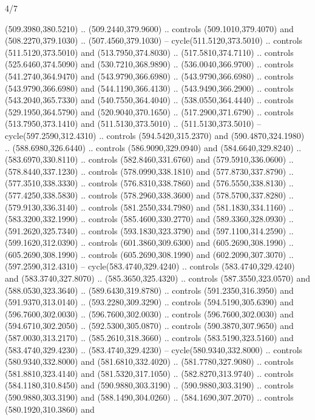 \begin{flagdescription}{4/7}
\begin{scope}[shift={(0.5\flaglength,0.5\flagwidth)},scale=\flagwidth*\stretchfactor/820]
\begin{scope}[scale=1.87,xshift=-138mm,yshift=75mm]
\begin{scope}[y=0.8pt, x=0.8pt, yscale=-1, xscale=1]
\begin{scope}[fill=c9ca168]
  (509.3980,380.5210) .. (509.2440,379.9600) .. controls (509.1010,379.4070) and
  (508.2270,379.1030) .. (507.4560,379.1030) -- cycle(511.5120,373.5010) ..
  controls (511.5120,373.5010) and (513.7950,374.8030) .. (517.5810,374.7110) ..
  controls (525.6460,374.5090) and (530.7210,368.9890) .. (536.0040,366.9700) ..
  controls (541.2740,364.9470) and (543.9790,366.6980) .. (543.9790,366.6980) ..
  controls (543.9790,366.6980) and (544.1190,366.4130) .. (543.9490,366.2900) ..
  controls (543.2040,365.7330) and (540.7550,364.4040) .. (538.0550,364.4440) ..
  controls (529.1950,364.5790) and (520.9040,370.1650) .. (517.2900,371.6790) ..
  controls (513.7950,373.1410) and (511.5130,373.5010) .. (511.5130,373.5010) --
  cycle(597.2590,312.4310) .. controls (594.5420,315.2370) and
  (590.4870,324.1980) .. (588.6980,326.6440) .. controls (586.9090,329.0940) and
  (584.6640,329.8240) .. (583.6970,330.8110) .. controls (582.8460,331.6760) and
  (579.5910,336.0600) .. (578.8440,337.1230) .. controls (578.0990,338.1810) and
  (577.8730,337.8790) .. (577.3510,338.3330) .. controls (576.8310,338.7860) and
  (576.5550,338.8130) .. (577.4250,338.5830) .. controls (578.2960,338.3600) and
  (578.5700,337.8280) .. (579.9130,336.3140) .. controls (581.2550,334.7980) and
  (581.1830,334.1160) .. (583.3200,332.1990) .. controls (585.4600,330.2770) and
  (589.3360,328.0930) .. (591.2620,325.7340) .. controls (593.1830,323.3790) and
  (597.1100,314.2590) .. (599.1620,312.0390) .. controls (601.3860,309.6300) and
  (605.2690,308.1990) .. (605.2690,308.1990) .. controls (605.2690,308.1990) and
  (602.2090,307.3070) .. (597.2590,312.4310) -- cycle(583.4740,329.4240) ..
  controls (583.4740,329.4240) and (583.3740,327.8070) .. (585.3650,325.4320) ..
  controls (587.3550,323.0570) and (588.0530,323.3640) .. (589.6430,319.8780) ..
  controls (591.2350,316.3950) and (591.9370,313.0140) .. (593.2280,309.3290) ..
  controls (594.5190,305.6390) and (596.7600,302.0030) .. (596.7600,302.0030) ..
  controls (596.7600,302.0030) and (594.6710,302.2050) .. (592.5300,305.0870) ..
  controls (590.3870,307.9650) and (587.0030,313.2170) .. (585.2610,318.3660) ..
  controls (583.5190,323.5160) and (583.4740,329.4230) .. (583.4740,329.4230) --
  cycle(580.9340,332.8000) .. controls (580.9340,332.8000) and
  (581.6810,332.4020) .. (581.7780,327.9080) .. controls (581.8810,323.4140) and
  (581.5320,317.1050) .. (582.8270,313.9740) .. controls (584.1180,310.8450) and
  (590.9880,303.3190) .. (590.9880,303.3190) .. controls (590.9880,303.3190) and
  (588.1490,304.0260) .. (584.1690,307.2070) .. controls (580.1920,310.3860) and

\end{scope}
\end{scope}
\end{scope}
\end{scope}
\end{flagdescription}
